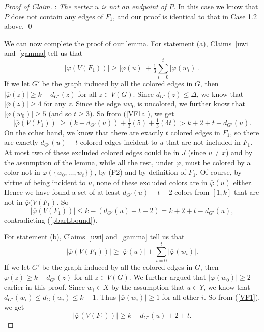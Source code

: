 \documentclass[11pt, oneside]{article}
\newcommand{\pbar}{\overline{\varphi}}
\newenvironment{proofc}{\begin{proof}[Proof of Claim]}{\end{proof}}
\begin{document}
\begin{proofc}
:  \emph{The vertex $u$ is not an endpoint of $P$.}   
In this case we know that $P$ does not contain any edges of $F_1$, and our proof is identical to that in Case 1.2 above. 
\qed

\vspace*{.2in}

We can now complete the proof of our lemma. For statement (a), Claims~\ref{uwi} and~\ref{gamma} tell us that
\begin{equation}\label{VF1a}
	|\pbar(V(F_1))|  \ge  |\pbar(u)|+ \tfrac{1}{3}\sum_{i=0}^t|\pbar(w_i)|.
\end{equation}
If we let $G'$ be the graph induced by all the colored edges in $G$, then $|\pbar(z)|\geq k-d_{G'}(z)$ for all $z\in V(G)$. Since $d_{G'}(z)\leq \Delta$, we know that $|\pbar(z)|\geq 4$ for any $z$. Since the edge $uw_0$ is uncolored, we further know that $|\pbar(w_0)|\geq 5$ (and so $t\ge 3$). So from (\ref{VF1a}), we get
\begin{equation}\label{pbarLbound}
|\pbar(V(F_1))|  \ge  (k-d_{G'}(u))+ \tfrac{1}{3}(5)+ \tfrac{1}{3}(4t)>k+2+t-d_{G'}(u).
\end{equation}
On the other hand, we know that there are exactly $t$ colored edges in $F_1$,  so there are exactly $d_{G'}(u)-t$ colored edges incident to $u$ that are not included in $F_1$. At most two of these excluded colored edges could be in $J$ (since $u\neq x$) and by the assumption of the lemma, while all the rest,     under $\varphi$,  must be colored by a color not in $\pbar(\{w_0, \ldots, w_t\})$, by (P2) and by definition of $F_1$. Of course, by virtue of being incident to $u$, none of these excluded colors are in $\pbar(u)$ either. Hence we have found a set of at least $d_{G'}(u)-t-2$ colors from $[1,k]$ that are not in $\pbar(V(F_1)$. So
$$|\pbar(V(F_1))| \leq k-(d_{G'}(u)-t-2)=k+2+t-d_{G'}(u),$$
contradicting (\ref{pbarLbound}).

For statement (b),
Claims~\ref{uwi} and~\ref{gamma} tell us that
\begin{equation}\label{VF1}
	|\pbar(V(F_1))|  \ge  |\pbar(u)|+ \sum_{i=0}^t|\pbar(w_i)|. 
\end{equation}
If we let $G'$ be the graph induced by all the colored edges in $G$, then $\pbar(z)\geq k-d_{G'}(z)$ for all $z\in V(G)$. 
We further argued that $|\pbar(w_0)|\geq 2$ earlier in this proof. Since $w_i\in X$ by the assumption that $u\in Y$, we know that $d_{G'}(w_i) \le d_G(w_i) \le k-1$. Thus $|\pbar(w_i)|\geq 1$ for all other $i$. So from (\ref{VF1}), we get
\begin{equation}\label{pbarLbound1}
	|\pbar(V(F_1))|  \ge k-d_{G'}(u)+ 2+ t.
\end{equation}



\end{proofc}
\end{document}
